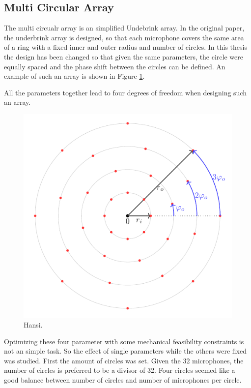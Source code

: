 \subsection{Multi Circular Array}
The multi circualr array is an simplified Undebrink array.
In the original paper, the underbrink array is designed, so that each
microphone covers the same area of a ring with a fixed inner and outer radius and number of circles.
In this thesis the design has been changed so that given the same parameters,
the circle were equally spaced and the phase shift between the circles can be defined.
An example of such an array is shown in Figure \ref*{aev:fig:FancyArr}.

All the parameters together lead to four degrees of freedom when designing such an array.
\begin{figure}
	\centering
	\includegraphics[]{images/5_array_evaluation/fancy_arr.pdf}
	\caption{Hansi.}
	\label{aev:fig:FancyArr}
\end{figure}
Optimizing these four parameter with some mechanical feasibility constraints is not an simple task.
So the effect of single parameters while the others were fixed was studied.
First the amount of circles was set.
Given the 32 microphones, the number of circles is preferred to be a divisor 
of 32.
Four circles seemed like a good balance between number of circles and number of microphones
per circle.

